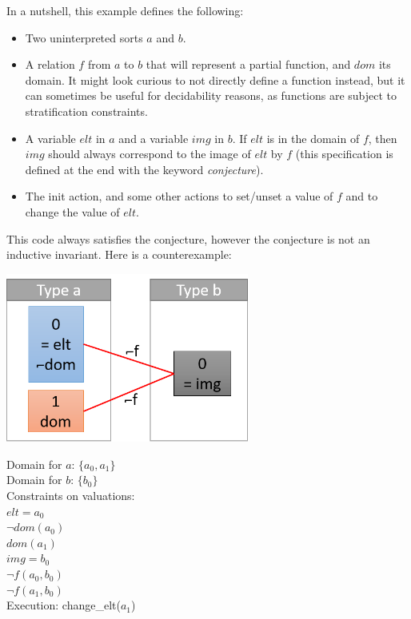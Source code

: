 \documentclass[11pt,a4paper,oldfontcommands,openany]{memoir}
\begin{document}
    In a nutshell, this example defines the following:
    \begin{itemize}
        \item Two uninterpreted sorts \(a\) and \(b\).
        \item A relation \(f\) from \(a\) to \(b\) that will represent a partial function, and \(dom\) its domain. It might look curious to not directly define a function instead,
        but it can sometimes be useful for decidability reasons, as functions are subject to stratification constraints.
        \item A variable \(elt\) in \(a\) and a variable \(img\) in \(b\). If \(elt\) is in the domain of \(f\), then \(img\) should always
        correspond to the image of \(elt\) by \(f\) (this specification is defined at the end with the keyword \textit{conjecture}).
        \item The init action, and some other actions to set/unset a value of \(f\) and to change the value of \(elt\).
    \end{itemize}

    This code always satisfies the conjecture, however the conjecture is not an inductive invariant. Here is a counterexample:\\

    \begin{minipage}{0.45\textwidth}
        \includegraphics[width=8cm]{NonMonotonicExCounterexample}
    \end{minipage} \hfill
    \begin{minipage}{0.45\textwidth}
        Domain for \(a\): \(\{a_0,a_1\}\)\\
        Domain for \(b\): \(\{b_0\}\)\\
        Constraints on valuations:\\
        \(elt = a_0\)\\
        \(\neg dom(a_0)\)\\
        \(dom(a_1)\)\\
        \(img = b_0\)\\
        \(\neg f(a_0,b_0)\)\\
        \(\neg f(a_1,b_0)\)\\
        Execution: change_elt(\(a_1\))
    \end{minipage}\\
\end{document}
